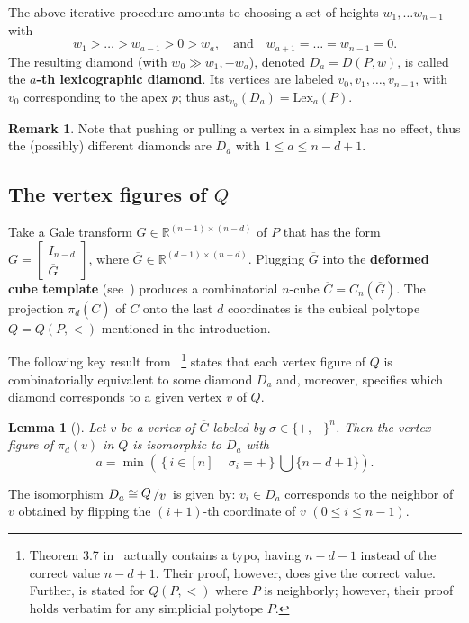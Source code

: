 \documentclass[a4paper,leqno]{article}
\newtheorem{lemma}[theorem]{Lemma}
\theoremstyle{definition}
\newtheorem{remark}[theorem]{Remark}
\newcommand{\anst}{\mathrm{ast}}
\newcommand{\lex}{\mathrm{Lex}}
\newcommand{\set}[2]{\left\{ #1\,\middle|\, #2\right\}}
\newcommand{\R}{\mathbb{R}}
\newcommand{\vfig}[2]{{\raisebox{.1em}{$#1$}\left/\raisebox{-.1em}{$#2$}\right.}}
\begin{document}
The above iterative procedure amounts to choosing a set of heights $w_1,\dots w_{n-1}$ with
\[
w_1>\dots>w_{a-1}>0>w_a,\quad\text{and}\quad w_{a+1}=\dots =w_{n-1}=0.
\]
The resulting diamond (with $w_0\gg w_1,-w_a$), denoted $D_a=D(P,w)$, is called the {\bf $a$-th lexicographic diamond}.
Its vertices are labeled $v_0, v_1, \dots, v_{n-1}$,
with $v_0$ corresponding to the apex $p$; thus $\anst_{v_0}(D_a)=\lex_a(P)$.

\begin{remark}
Note that pushing or pulling a vertex in a simplex has no effect, thus the (possibly) different diamonds
are $D_a$ with $1\leq a\leq n-d+1$.
\end{remark}


\subsection{The vertex figures of $Q$}

Take a Gale transform $G\in \R^{(n-1)\times(n-d)}$ of $P$ that has the form $G=\begin{bmatrix}
I_{n-d}\\
\overline{G}
\end{bmatrix}$, where $\overline{G}\in\R^{(d-1)\times (n-d)}$. Plugging $\overline{G}$ into the {\bf deformed cube template} (see~\cite[Definition 3.1]{SanyZ10}) produces a combinatorial $n$-cube $\overline{C}=C_n(\overline{G})$. The projection $\pi_d(\overline{C})$ of $\overline{C}$ onto the last $d$ coordinates is the cubical polytope $Q=Q(P,<)$ mentioned in the introduction.

The following key result from~\cite{SanyZ10}%
\footnote{Theorem 3.7 in~\cite{SanyZ10} actually contains a typo, having $n-d-1$ instead of the correct value $n-d+1$. Their proof, however, does give the correct value.
Further, \cite[Theorem 3.7]{SanyZ10} is stated for $Q(P,<)$ where $P$ is neighborly; however, their proof holds verbatim for any simplicial polytope $P$.
}
states that each vertex figure of $Q$ is combinatorially equivalent to some diamond $D_a$ and, moreover, specifies which diamond corresponds to a given vertex $v$ of $Q$.
\begin{lemma}[{\cite[Theorem 3.7]{SanyZ10}}]\label{lem:SZ}
Let $v$ be a vertex of $\overline{C}$ labeled by $\sigma\in\{+,-\}^n$. Then the vertex figure of $\pi_d(v)$ in $Q$ is isomorphic to $D_a$ with
$$a=\min\left(\set{i\in [n]}{\sigma_i=+}\bigcup \{n-d+1\}\right).$$
\end{lemma}

The isomorphism $D_a\cong \vfig{Q}{v}$ is given by:
$v_i\in D_a$ corresponds to the neighbor of $v$ obtained by flipping the $(i+1)$-th coordinate of $v$ $(0 \leq i \leq n-1)$.
\end{document}
